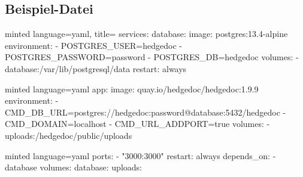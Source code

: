 \subsection{Beispiel-Datei}
\begin{frame}[fragile]
    \slidehead
    \vspace{-1em}
    \small
    \begin{codeBlock}{minted language=yaml, title=}
        services:
            database:
                image: postgres:13.4-alpine
                environment:
                - POSTGRES_USER=hedgedoc
                - POSTGRES_PASSWORD=password
                - POSTGRES_DB=hedgedoc
                volumes:
                - database:/var/lib/postgresql/data
                restart: always
    \end{codeBlock}
\end{frame}
\begin{frame}[fragile]
    \slidehead
    \vspace{-1em}
    \small
    \begin{codeBlock}{minted language=yaml}
        app:
            image: quay.io/hedgedoc/hedgedoc:1.9.9
            environment:
            - CMD_DB_URL=postgres://hedgedoc:password@database:5432/hedgedoc
            - CMD_DOMAIN=localhost
            - CMD_URL_ADDPORT=true
            volumes:
            - uploads:/hedgedoc/public/uploads
    \end{codeBlock}
\end{frame}
\begin{frame}[fragile]
    \slidehead
    \vspace{-1em}
    \small
    \begin{codeBlock}{minted language=yaml}
        ports:
            - "3000:3000"
            restart: always
            depends_on:
            - database
        volumes:
            database:
            uploads:
    \end{codeBlock}
\end{frame}


